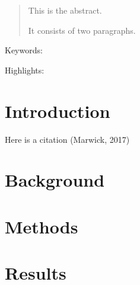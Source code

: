 \documentclass[]{elsarticle} %
\begin{document}
\begin{frontmatter}

  \title{}
    \author[Some Institute of Technology]{Alice Anonymous}
    \author[Another University]{Bob Security}
    \author[Another University]{Cat Memes}
    \author[Some Institute of Technology]{Derek Zoolander}
      \address[Some Institute of Technology]{Department, Street, City, State, Zip}
    \address[Another University]{Department, Street, City, State, Zip}
  
  \begin{abstract}
  This is the abstract.

  It consists of two paragraphs.
  \end{abstract}
  
 \end{frontmatter}

Keywords:

Highlights:

\hypertarget{introduction}{%
\section{Introduction}\label{introduction}}

Here is a citation (Marwick, 2017)

\hypertarget{background}{%
\section{Background}\label{background}}

\hypertarget{methods}{%
\section{Methods}\label{methods}}

\hypertarget{results}{%
\section{Results}\label{results}}
\end{document}
